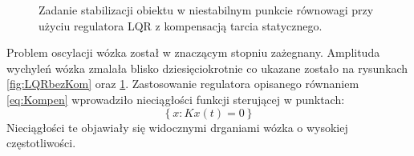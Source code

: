 \begin{figure}[H]
	\caption{Zadanie stabilizacji obiektu w niestabilnym punkcie równowagi przy użyciu regulatora LQR z kompensacją tarcia statycznego.}
\label{fig:LQRkom}
\end{figure}
Problem oscylacji wózka został w znaczącym stopniu zażegnany. Amplituda wychyleń wózka zmalała blisko dziesięciokrotnie co ukazane zostało na rysunkach \ref{fig:LQRbezKom} oraz \ref{fig:LQRkom}. Zastosowanie regulatora opisanego równaniem \ref{eq:Kompen}  wprowadziło nieciągłości funkcji sterującej w punktach:
 \begin{equation}
\left\lbrace x: Kx(t)=0\right\rbrace 
\end{equation}
Nieciągłości te objawiały się widocznymi drganiami wózka o wysokiej częstotliwości.
